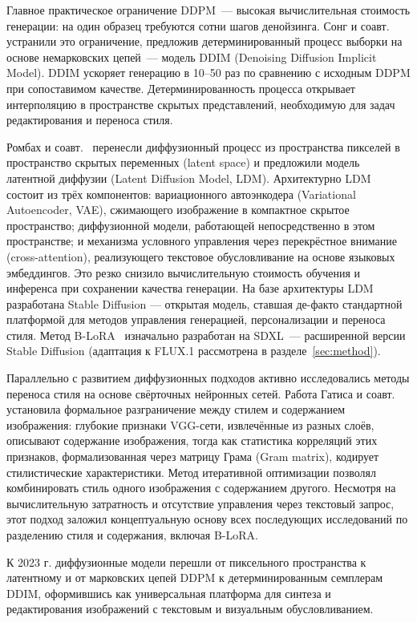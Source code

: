 Главное практическое ограничение DDPM~--- высокая вычислительная стоимость генерации: на один образец требуются сотни шагов денойзинга. Сонг и соавт.~\cite{song2021ddim} устранили это ограничение, предложив детерминированный процесс выборки на основе немарковских цепей~--- модель DDIM (Denoising Diffusion Implicit Model). DDIM ускоряет генерацию в 10--50 раз по сравнению с исходным DDPM при сопоставимом качестве. Детерминированность процесса открывает интерполяцию в пространстве скрытых представлений, необходимую для задач редактирования и переноса стиля.

Ромбах и соавт.~\cite{rombach2022ldm} перенесли диффузионный процесс из пространства пикселей в пространство скрытых переменных (latent space) и предложили модель латентной диффузии (Latent Diffusion Model, LDM). Архитектурно LDM состоит из трёх компонентов: вариационного автоэнкодера (Variational Autoencoder, VAE), сжимающего изображение в компактное скрытое пространство; диффузионной модели, работающей непосредственно в этом пространстве; и механизма условного управления через перекрёстное внимание (cross-attention), реализующего текстовое обусловливание на основе языковых эмбеддингов. Это резко снизило вычислительную стоимость обучения и инференса при сохранении качества генерации. На базе архитектуры LDM разработана Stable Diffusion --- открытая модель, ставшая де-факто стандартной платформой для методов управления генерацией, персонализации и переноса стиля. Метод B-LoRA~\cite{frenkel2024blora} изначально разработан на SDXL~--- расширенной версии Stable Diffusion (адаптация к FLUX.1 рассмотрена в разделе~\ref{sec:method}).

Параллельно с развитием диффузионных подходов активно исследовались методы переноса стиля на основе свёрточных нейронных сетей. Работа Гатиса и соавт.~\cite{gatys2016nst} установила формальное разграничение между стилем и содержанием изображения: глубокие признаки VGG-сети, извлечённые из разных слоёв, описывают содержание изображения, тогда как статистика корреляций этих признаков, формализованная через матрицу Грама (Gram matrix), кодирует стилистические характеристики. Метод итеративной оптимизации позволял комбинировать стиль одного изображения с содержанием другого. Несмотря на вычислительную затратность и отсутствие управления через текстовый запрос, этот подход заложил концептуальную основу всех последующих исследований по разделению стиля и содержания, включая B-LoRA.

К 2023 г. диффузионные модели перешли от пиксельного пространства к латентному и от марковских цепей DDPM к детерминированным семплерам DDIM, оформившись как универсальная платформа для синтеза и редактирования изображений с текстовым и визуальным обусловливанием.


